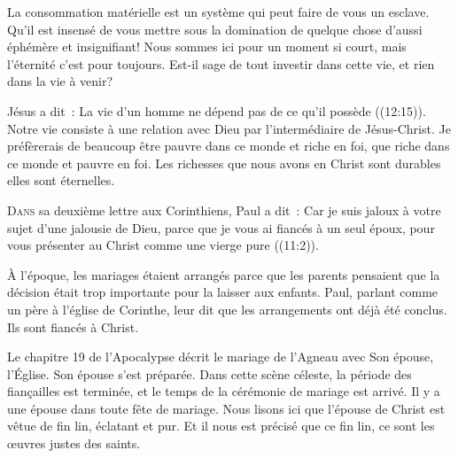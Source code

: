 
La consommation matérielle est un système qui peut faire de vous un esclave.
 Qu'il est insensé de vous mettre sous la domination de quelque chose
 d'aussi éphémère et insignifiant!
 Nous sommes ici pour un moment si court, mais l'éternité c'est pour toujours.
 Est-il sage de tout investir dans cette vie, et rien dans la vie à venir?

Jésus a dit~: 
 \og La vie d'un homme ne dépend pas de ce qu'il possède \fg{}
 ((12:15)).
 Notre vie consiste à une relation avec Dieu par l'intermédiaire
 de Jésus-Christ. Je préfèrerais de beaucoup être pauvre dans ce monde
 et riche en foi, que riche dans ce monde et pauvre en foi.
 Les richesses que nous avons en Christ sont durables
 \ocadr elles sont éternelles.

\dvrule






\lettrine{D}{ans} sa deuxième lettre aux Corinthiens,
 Paul a dit~: 
 \og Car je suis jaloux à votre sujet d'une jalousie de Dieu,
 parce que je vous ai fiancés à un seul époux,
 pour vous présenter au Christ comme une vierge pure \fg{}
 ((11:2)). 

À l'époque, les mariages étaient arrangés parce que les parents
 pensaient que la décision était trop importante pour la laisser aux enfants.
 Paul, parlant comme un père à l'église de Corinthe,
 leur dit que les arrangements ont déjà été conclus.
 Ils sont fiancés à Christ. 

Le chapitre 19 de l'Apocalypse décrit le mariage de l'Agneau avec Son épouse,
 l'Église. 
 \og Son épouse s'est préparée. \fg{} 
 Dans cette scène céleste, la période des fiançailles est terminée,
 et le temps de la cérémonie de mariage est arrivé.
 Il y a une épouse dans toute fête de mariage.
 Nous lisons ici que l'épouse de Christ est \og vêtue de fin lin,
 éclatant et pur. \fg{} 
 Et il nous est précisé que ce fin lin, ce sont
 \og les \oe{}uvres justes des saints. \fg{}  


